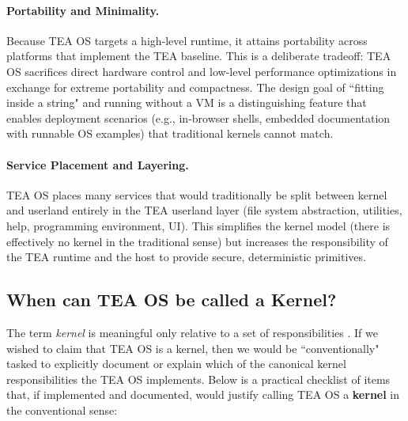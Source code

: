\documentclass{article}
\begin{document}
\paragraph{Portability and Minimality.} Because TEA OS targets a high‑level runtime, it attains portability across platforms that implement the TEA baseline. This is a deliberate tradeoff: TEA OS sacrifices direct hardware control and low‑level performance optimizations in exchange for extreme portability and compactness. The design goal of ``fitting inside a string" and running without a VM is a distinguishing feature that enables deployment scenarios (e.g., in‑browser shells, embedded documentation with runnable OS examples) that traditional kernels cannot match.

\paragraph{Service Placement and Layering.} TEA OS places many services that would traditionally be split between kernel and userland entirely in the TEA userland layer (file system abstraction, utilities, help, programming environment, UI). This simplifies the kernel model (there is effectively no kernel in the traditional sense) but increases the responsibility of the TEA runtime and the host to provide secure, deterministic primitives.

\subsection{When can TEA OS be called a Kernel?}

The term \emph{kernel} is meaningful only relative to a set of responsibilities \cite{copilot_assistant}.  If we wished to claim that TEA OS is a kernel, then we would be ``conventionally" tasked to explicitly document or explain which of the canonical kernel responsibilities the TEA OS implements.  Below is a practical checklist of items that, if implemented and documented, would justify calling TEA OS a \textbf{kernel} in the conventional sense:
\end{document}
